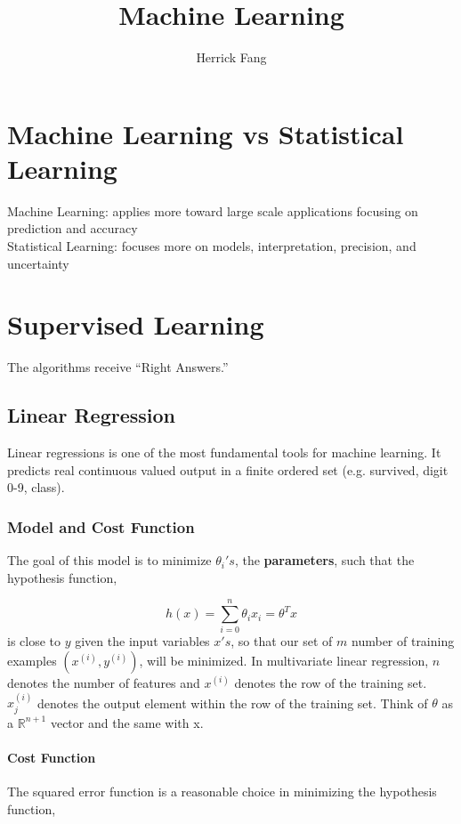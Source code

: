 \documentclass{article}
\title{Machine Learning}
\author{Herrick Fang}
\date{ }
\begin{document}
\maketitle

\tableofcontents

\section{Machine Learning vs Statistical Learning}
Machine Learning: applies more toward large scale applications focusing on prediction and accuracy
\\
Statistical Learning: focuses more on models, interpretation, precision, and uncertainty

\section{Supervised Learning}
The algorithms receive ``Right Answers.''   

\subsection{Linear Regression}
Linear regressions is one of the most fundamental tools for machine learning. It predicts real continuous valued output in a finite ordered set (e.g. survived, digit 0-9, class).

\subsubsection{Model and Cost Function}
The goal of this model is to minimize $\theta_{i}'s$, the {\bf parameters}, such that the hypothesis function,

\begin{equation}
     \label{eq:hypothesis_function}
       h(x) = \sum_{i=0}^{n}\theta_i x_i = \theta^Tx
\end{equation}
is close to $y$ given the input variables $x's$, so that our set of $m$ number of training examples  $\left( x^{\left( i \right)}, y^{\left( i \right)} \right) $, will be minimized. In multivariate linear regression, $n$ denotes the number of features and $x^{\left( i \right)}$ denotes the row of the training set. $x_{j}^{\left( i \right)}$ denotes the output element within the row of the training set. Think of $\theta$ as a $\mathbb{R}^{n+1}$ vector and the same with x.


\paragraph{Cost Function}
The squared error function is a reasonable choice in minimizing the hypothesis function,
\end{document}

